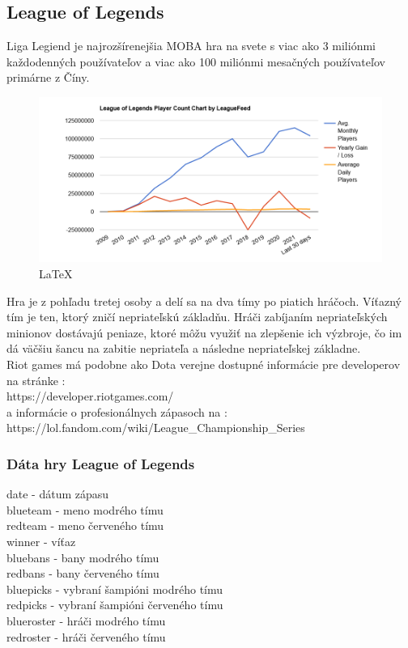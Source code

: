 \subsection{League of Legends}
Liga Legiend je najrozšírenejšia MOBA hra na svete s viac ako 3 miliónmi každodenných používateľov a viac ako 100 miliónmi mesačných používateľov primárne z Číny. \cite{leaguefeed} 

 \begin{figure}[h!]
	
	\includegraphics[width=.9\textwidth]{figures/leaguegraph}
	\centering
	\caption{\LaTeX{}   \label{leaguegraph}}
	
\end{figure}

Hra je z pohľadu tretej osoby a delí sa na dva tímy po piatich hráčoch. Víťazný tím je ten, ktorý zničí nepriateľskú základňu. Hráči zabíjaním nepriateľských minionov dostávajú peniaze, ktoré môžu využiť na zlepšenie ich výzbroje, čo im dá väčšiu šancu na zabitie nepriateľa a následne nepriateľskej základne.
\\ 
Riot games má podobne ako Dota verejne dostupné informácie pre developerov na stránke : 
\\ 
https://developer.riotgames.com/  
\\
a informácie o profesionálnych zápasoch na :
\\
https://lol.fandom.com/wiki/League\_Championship\_Series

\subsubsection{Dáta hry League of Legends}

date - dátum zápasu \\
blueteam - meno modrého tímu \\
redteam - meno červeného tímu \\
winner - víťaz \\
bluebans - bany modrého tímu \\
redbans - bany červeného tímu \\
bluepicks - vybraní šampióni modrého tímu \\
redpicks - vybraní šampióni červeného tímu \\
blueroster - hráči modrého tímu \\
redroster - hráči červeného tímu 

